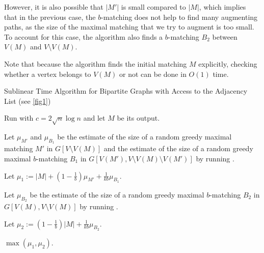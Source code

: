 \documentclass[letterpaper,11pt]{article}
\begin{document}
However, it is also possible that $|M'|$ is small compared to $|M|$, which implies that in the previous case, the $b$-matching does not help to find many augmenting paths, as the size of the maximal matching that we try to augment is too small. To account for this case, the algorithm also finds a $b$-matching $B_2$ between $V(M)$ and $V \setminus V(M)$. 

Note that because the algorithm finds the initial matching $M$ explicitly, checking whether a vertex belongs to $V(M)$ or not can be done in $O(1)$ time.





\begin{algorithm}[H]
\caption{Sublinear Time Algorithm for Bipartite Graphs with Access to the Adjacency List (see \cref{fig1})}
\label{alg:sublinear-first}

Run  with $c = 2\sqrt{n} \log n$ and let $M$ be its output.

Let $\mu_{M'}$ and $\mu_{B_1}$ be the estimate of the size of a random greedy maximal matching $M'$ in $G[V \setminus V(M)]$ and the estimate of the size of a random greedy maximal $b$-matching $B_1$ in $G[V(M'), V \setminus V(M) \setminus V(M')]$ by running . 

Let $\mu_1 := |M| + (1 - \frac{1}{b}) \mu_{M'} + \frac{1}{kb} \mu_{B_1}$. 

Let $\mu_{B_2}$ be the estimate of the size of a random greedy maximal $b$-matching $B_2$ in $G[V(M), V \setminus V(M)]$ by running . 

Let $\mu_2 := (1 - \frac{1}{b}) |M| + \frac{1}{kb} \mu_{B_2}$. 

\Return $\max (\mu_1, \mu_2)$.

\end{algorithm}
\end{document}
